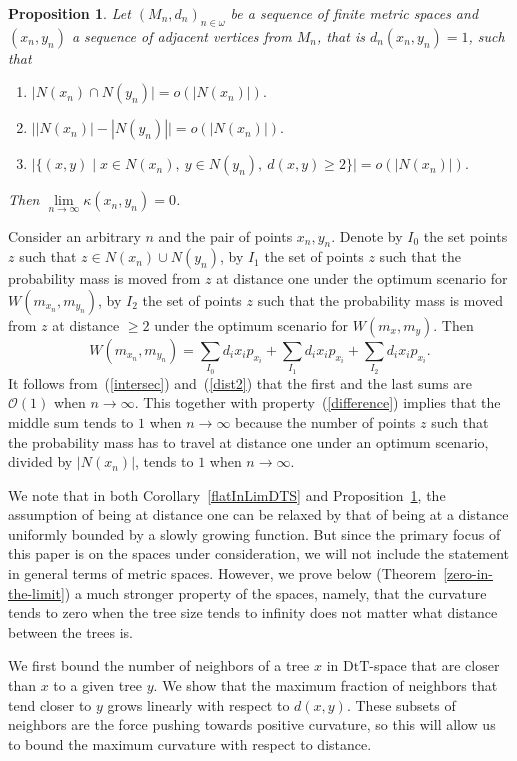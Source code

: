 \documentclass{amsart}
\newtheorem{proposition}[lemma]{Proposition}
\newcommand{\dts}{\mathrm{DtT}}
\renewcommand{\O}{\mathcal{O}}
\begin{document}
\begin{proposition}\label{flatInLimGen}
Let $(M_n,d_n)_{n \in \omega}$ be a sequence of finite metric spaces and
$(x_n, y_n)$ a sequence of adjacent vertices from $M_n$,
that is $d_n(x_n,y_n) = 1$, such that
\begin{enumerate}[(1)]
\item\label{intersec} $\big|N(x_n) \cap N(y_n)\big| = o(|N(x_n)|).$
\item\label{difference} $\big||N(x_n)| - |N(y_n)|\big| = o(|N(x_n)|).$
\item\label{dist2} $\big|\{(x,y) \mid
	x \in N(x_n),~ y \in N(y_n),~ d(x, y) \geq 2\}\big| = o(|N(x_n)|).$
\end{enumerate}

Then $\lim\limits_{n \to \infty} \kappa(x_n, y_n) = 0$.
\end{proposition}

\proof
Consider an arbitrary $n$ and the pair of points $x_n,y_n$. Denote by $I_0$ the
set points $z$ such that $z \in N(x_n) \cup N(y_n)$, by $I_1$ the set of points
$z$ such that the probability mass is moved from $z$ at distance one under the
optimum scenario for $W(m_{x_n},m_{y_n})$, by $I_2$ the set of points $z$ such that
the probability mass is moved from $z$ at distance $\geq 2$ under the optimum
scenario for $W(m_x,m_y)$. Then
\[
W(m_{x_n},m_{y_n}) = \sum_{I_0} d_i x_i p_{x_i} + \sum_{I_1} d_i x_i p_{x_i} +
\sum_{I_2} d_i x_i p_{x_i}.
\]
It follows from~(\ref{intersec}) and~(\ref{dist2}) that the first and the last sums
are $\O(1)$ when $n\to\infty$. This together with property~(\ref{difference})
implies that the middle sum tends to $1$ when $n\to\infty$ because the number of
points $z$ such that the probability mass has to travel at distance one under an
optimum scenario, divided by $|N(x_n)|$, tends to $1$ when $n\to\infty$.
\endproof

We note that in both Corollary~\ref{flatInLimDTS} and Proposition~\ref{flatInLimGen}, the assumption of being at distance one can be relaxed by that of being at a distance uniformly bounded by a slowly growing function.
But since the primary focus of this paper is on the spaces under consideration, we will not  include the statement in general terms of metric spaces.
However, we prove below (Theorem~\ref{zero-in-the-limit}) a much stronger property of the spaces, namely, that the curvature tends to zero when the tree size tends to infinity does not matter what distance between the trees is.

We first bound the number of neighbors of a tree $x$ in $\dts$-space that are closer than $x$ to a given tree $y$.
We show that the maximum fraction of neighbors that tend closer to $y$ grows linearly with respect to $d(x,y)$.
These subsets of neighbors are the force pushing towards positive curvature, so this will allow us to bound the maximum curvature with respect to distance.
\end{document}
